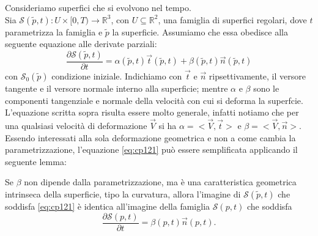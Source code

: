 Consideriamo superfici che si evolvono nel tempo. \\
Sia $\mathcal{S}(\tilde{p},t):U\times[0,T)\longrightarrow\mathbb{R}^3$, con $U\subseteq\mathbb{R}^2$, una famiglia di superfici regolari, dove $t$ parametrizza la famiglia e $\tilde{p}$ la superficie. Assumiamo che essa obedisce alla seguente equazione alle derivate parziali:
\begin{equation}
  \label{eq:cp121}
  \frac{\partial\mathcal{S}(\tilde{p},t)}{\partial t} = \alpha(\tilde{p},t)\vec{t}(\tilde{p},t) + \beta(\tilde{p},t)\vec{n}(\tilde{p},t)
\end{equation}
con $\mathcal{S}_0(\tilde{p})$ condizione iniziale. Indichiamo con $\vec{t}$ e $\vec{n}$ ripsettivamente, il versore tangente e il versore normale interno alla superficie; mentre $\alpha$ e $\beta$ sono le componenti tangenziale e normale della velocità con cui si deforma la superfcie. L'equazione scritta sopra risulta essere molto generale, infatti notiamo che per una qualsiasi velocità di deformazione $\vec{V}$ si ha $\alpha=<\vec{V},\vec{t}>$ e $\beta=<\vec{V},\vec{n}>$. Essendo interessati alla sola deformazione geometrica e non a come cambia la parametrizzazione, l'equazione \eqref{eq:cp121} può essere semplificata applicando il seguente lemma:
\begin{lemma}
\label{lemm:cp-121}
Se $\beta$ non dipende dalla parametrizzazione, ma è una caratteristica geometrica intrinseca della superficie, tipo la curvatura, allora l'imagine di $\mathcal{S}(\tilde{p},t)$ che soddisfa \eqref{eq:cp121} è identica all'imagine della famiglia $\mathcal{S}(p,t)$ che soddisfa
\begin{equation}
  \label{eq:cp122}
  \frac{\partial\mathcal{S}(p,t)}{\partial t} =\beta(p,t)\vec{n}(p,t).
\end{equation}
\end{lemma}


